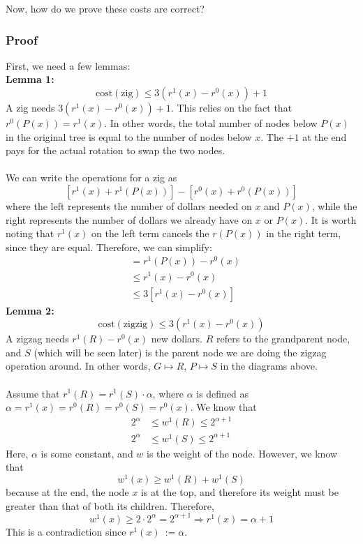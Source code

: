 \documentclass[10pt]{article}
\begin{document}
Now, how do we prove these costs are correct?
\subsubsection*{Proof}
First, we need a few lemmas:\\
\textbf{Lemma 1:} 
\[\text{cost}(\text{zig}) \leq 3(r^1(x) - r^0(x)) + 1\]
A zig needs $3(r^1(x) - r^0(x)) + 1$.  This relies on the fact that $r^0(P(x)) = r^1(x)$.  In other words, the total number of nodes below $P(x)$ in the original tree is equal to the number of nodes below $x$.  The $+1$ at the end pays for the actual rotation to swap the two nodes.\\\\
We can write the operations for a zig as
\[[r^1(x) + r^1(P(x))] - [r^0(x) + r^0(P(x))]\]
where the left represents the number of dollars needed on $x$ and $P(x)$, while the right represents the number of dollars we already have on $x$ or $P(x)$.  It is worth noting that $r^1(x)$ on the left term cancels the $r(P(x))$ in the right term, since they are equal.  Therefore, we can simplify:
\begin{align*}
    &= r^1(P(x)) - r^0(x) \\
    &\leq r^1(x) - r^0(x) \\
    &\leq 3[r^1(x) - r^0(x)]
\end{align*}
\textbf{Lemma 2:}
\[\text{cost}(\text{zigzig}) \leq 3(r^1(x) - r^0(x))\]
A zigzag needs $r^1(R) - r^0(x)$ new dollars.  $R$ refers to the grandparent node, and $S$ (which will be seen later) is the parent node we are doing the zigzag operation around.  In other words, $G \mapsto R$, $P \mapsto S$ in the diagrams above.\\\\
Assume that $r^1(R) = r^1(S) \cdot \alpha$, where $\alpha$ is defined as $\alpha = r^1(x) = r^0(R) = r^0(S) = r^0(x)$.  We know that
\begin{align*}
    2^\alpha &\leq w^1(R) \leq 2^{\alpha + 1} \\
    2^\alpha &\leq w^1(S) \leq 2^{\alpha + 1}
\end{align*}
Here, $\alpha$ is some constant, and $w$ is the weight of the node.  However, we know that
\[w^1(x) \geq w^1(R) + w^1(S)\]
because at the end, the node $x$ is at the top, and therefore its weight must be greater than that of both its children.  Therefore,
\[w^1(x) \geq 2 \cdot 2^\alpha = 2^{\alpha + 1} \Rightarrow r^1(x) = \alpha + 1\]
This is a contradiction since $r^1(x) \::= \alpha$.
\end{document}
